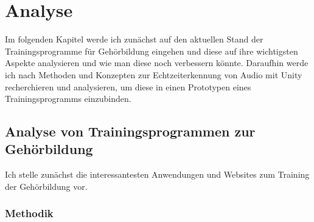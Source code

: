 \chapter{Analyse}

%
%
Im folgenden Kapitel werde ich zunächst auf den aktuellen Stand der Trainingsprogramme für Gehörbildung eingehen und diese auf ihre wichtigsten Aspekte analysieren und wie man diese noch verbessern könnte. Daraufhin werde ich nach Methoden und Konzepten zur Echtzeiterkennung von Audio mit Unity recherchieren und analysieren, um diese in einen Prototypen eines Trainingsprogramms einzubinden.

\section{Analyse von Trainingsprogrammen zur Gehörbildung}
Ich stelle zunächst die interessantesten Anwendungen und Websites zum Training der Gehörbildung vor.
\subsection{Methodik}
%


